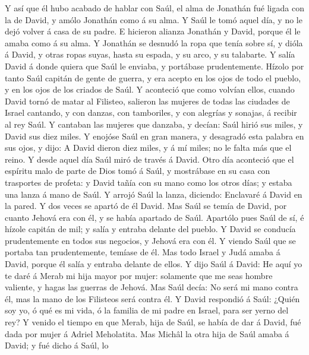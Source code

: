  Y así que él hubo acabado de hablar con Saúl, el alma de
Jonathán fué ligada con la de David, y amólo Jonathán como á su alma.
 Y Saúl le tomó aquel día, y no le dejó volver á casa de
su padre.  E hicieron alianza Jonathán y David, porque él
le amaba como á su alma.  Y Jonathán se desnudó la ropa
que tenía sobre sí, y dióla á David, y otras ropas suyas, hasta su
espada, y su arco, y su talabarte.  Y salía David á donde
quiera que Saúl le enviaba, y portábase prudentemente. Hízolo por tanto
Saúl capitán de gente de guerra, y era acepto en los ojos de todo el
pueblo, y en los ojos de los criados de Saúl.  Y aconteció
que como volvían ellos, cuando David tornó de matar al Filisteo,
salieron las mujeres de todas las ciudades de Israel cantando, y con
danzas, con tamboriles, y con alegrías y sonajas, á recibir al rey Saúl.
 Y cantaban las mujeres que danzaba, y decían: Saúl hirió
sus miles, y David sus diez miles.  Y enojóse Saúl en gran
manera, y desagradó esta palabra en sus ojos, y dijo: A David dieron
diez miles, y á mí miles; no le falta más que el reino.  Y
desde aquel día Saúl miró de través á David.  Otro día
aconteció que el espíritu malo de parte de Dios tomó á Saúl, y
mostrábase en su casa con trasportes de profeta: y David tañía con su
mano como los otros días; y estaba una lanza á mano de Saúl.
 Y arrojó Saúl la lanza, diciendo: Enclavaré á David en
la pared. Y dos veces se apartó de él David.  Mas Saúl se
temía de David, por cuanto Jehová era con él, y se había apartado de
Saúl.  Apartólo pues Saúl de sí, é hízole capitán de mil;
y salía y entraba delante del pueblo.  Y David se
conducía prudentemente en todos sus negocios, y Jehová era con él.
 Y viendo Saúl que se portaba tan prudentemente, temíase
de él.  Mas todo Israel y Judá amaba á David, porque él
salía y entraba delante de ellos.  Y dijo Saúl á David:
He aquí yo te daré á Merab mi hija mayor por mujer: solamente que me
seas hombre valiente, y hagas las guerras de Jehová. Mas Saúl decía: No
será mi mano contra él, mas la mano de los Filisteos será contra él.
 Y David respondió á Saúl: ¿Quién soy yo, ó qué es mi
vida, ó la familia de mi padre en Israel, para ser yerno del rey?
 Y venido el tiempo en que Merab, hija de Saúl, se había
de dar á David, fué dada por mujer á Adriel Meholatita. 
Mas Michâl la otra hija de Saúl amaba á David; y fué dicho á Saúl, lo
